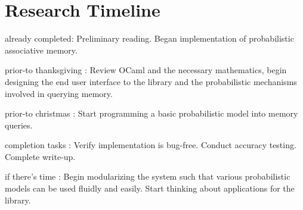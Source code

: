 \documentclass{sig-alternate}
\begin{document}
\section{Research Timeline}
\label{sec:research_timeline}

\begin{itemize*}
	\item {\sc already completed}: Preliminary reading. Began implementation of probabilistic associative memory.\vspace{3pt}
	\item {\sc prior-to thanksgiving} : Review OCaml and the necessary mathematics, begin designing the end user interface to the library and the probabilistic mechanisms involved in querying memory.\vspace{3pt}
	\item {\sc prior-to christmas} : Start programming a basic probabilistic model into memory queries.\vspace{3pt}
	\item {\sc completion tasks} : Verify implementation is bug-free. Conduct accuracy testing. Complete write-up.\vspace{3pt}
	\item {\sc if there's time} : Begin modularizing the system such that various probabilistic models can be used fluidly and easily. 
                                    Start thinking about applications for the library.
\end{itemize*}


\vspace{175pt}

\end{document}
